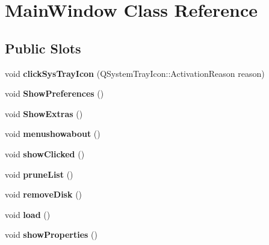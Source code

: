 \hypertarget{classMainWindow}{
\section{MainWindow Class Reference}
\label{classMainWindow}
}
\subsection*{Public Slots}
\begin{DoxyCompactItemize}
\item 
\hypertarget{classMainWindow_a571e513ee5005742161fd4de81c86ca2}{
void {\bfseries clickSysTrayIcon} (QSystemTrayIcon::ActivationReason reason)}
\label{classMainWindow_a571e513ee5005742161fd4de81c86ca2}

\item 
\hypertarget{classMainWindow_a7aec36163c9dfeda7da43b3e0854d673}{
void {\bfseries ShowPreferences} ()}
\label{classMainWindow_a7aec36163c9dfeda7da43b3e0854d673}

\item 
\hypertarget{classMainWindow_ae3130ae3dcc5f6261fb633f52ec062a7}{
void {\bfseries ShowExtras} ()}
\label{classMainWindow_ae3130ae3dcc5f6261fb633f52ec062a7}

\item 
\hypertarget{classMainWindow_a95d7c8c04e09437afc222121d383a722}{
void {\bfseries menushowabout} ()}
\label{classMainWindow_a95d7c8c04e09437afc222121d383a722}

\item 
\hypertarget{classMainWindow_ac2a292cdcf39848ec42e6352f011ddd1}{
void {\bfseries showClicked} ()}
\label{classMainWindow_ac2a292cdcf39848ec42e6352f011ddd1}

\item 
\hypertarget{classMainWindow_a202e9111e76a514c151fffa424b01b73}{
void {\bfseries pruneList} ()}
\label{classMainWindow_a202e9111e76a514c151fffa424b01b73}

\item 
\hypertarget{classMainWindow_aea6d2dc29c9cb6f4848a540ba3e5007e}{
void {\bfseries removeDisk} ()}
\label{classMainWindow_aea6d2dc29c9cb6f4848a540ba3e5007e}

\item 
\hypertarget{classMainWindow_a692f2f28196cc9ee41b10e89c5d32922}{
void {\bfseries load} ()}
\label{classMainWindow_a692f2f28196cc9ee41b10e89c5d32922}

\item 
\hypertarget{classMainWindow_a4da9a80d3c5a312dde4fa246436d100f}{
void {\bfseries showProperties} ()}
\label{classMainWindow_a4da9a80d3c5a312dde4fa246436d100f}


\end{DoxyCompactItemize}
